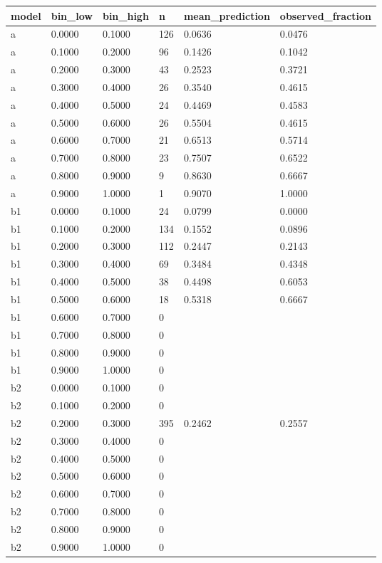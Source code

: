 \begin{tabular}{llllll}
\hline
model & bin\_low & bin\_high & n & mean\_prediction & observed\_fraction \\
\hline
a & 0.0000 & 0.1000 & 126 & 0.0636 & 0.0476 \\
a & 0.1000 & 0.2000 & 96 & 0.1426 & 0.1042 \\
a & 0.2000 & 0.3000 & 43 & 0.2523 & 0.3721 \\
a & 0.3000 & 0.4000 & 26 & 0.3540 & 0.4615 \\
a & 0.4000 & 0.5000 & 24 & 0.4469 & 0.4583 \\
a & 0.5000 & 0.6000 & 26 & 0.5504 & 0.4615 \\
a & 0.6000 & 0.7000 & 21 & 0.6513 & 0.5714 \\
a & 0.7000 & 0.8000 & 23 & 0.7507 & 0.6522 \\
a & 0.8000 & 0.9000 & 9 & 0.8630 & 0.6667 \\
a & 0.9000 & 1.0000 & 1 & 0.9070 & 1.0000 \\
b1 & 0.0000 & 0.1000 & 24 & 0.0799 & 0.0000 \\
b1 & 0.1000 & 0.2000 & 134 & 0.1552 & 0.0896 \\
b1 & 0.2000 & 0.3000 & 112 & 0.2447 & 0.2143 \\
b1 & 0.3000 & 0.4000 & 69 & 0.3484 & 0.4348 \\
b1 & 0.4000 & 0.5000 & 38 & 0.4498 & 0.6053 \\
b1 & 0.5000 & 0.6000 & 18 & 0.5318 & 0.6667 \\
b1 & 0.6000 & 0.7000 & 0 &  &  \\
b1 & 0.7000 & 0.8000 & 0 &  &  \\
b1 & 0.8000 & 0.9000 & 0 &  &  \\
b1 & 0.9000 & 1.0000 & 0 &  &  \\
b2 & 0.0000 & 0.1000 & 0 &  &  \\
b2 & 0.1000 & 0.2000 & 0 &  &  \\
b2 & 0.2000 & 0.3000 & 395 & 0.2462 & 0.2557 \\
b2 & 0.3000 & 0.4000 & 0 &  &  \\
b2 & 0.4000 & 0.5000 & 0 &  &  \\
b2 & 0.5000 & 0.6000 & 0 &  &  \\
b2 & 0.6000 & 0.7000 & 0 &  &  \\
b2 & 0.7000 & 0.8000 & 0 &  &  \\
b2 & 0.8000 & 0.9000 & 0 &  &  \\
b2 & 0.9000 & 1.0000 & 0 &  &  \\
\hline
\end{tabular}
